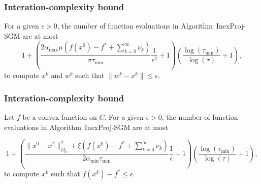 \begin{frame}[c]\frametitle{Interation-complexity bound}
\begin{theorem}
  For a given $\epsilon>0$, the number  of  function evaluations in  Algorithm~InexProj-SGM are  at most
    $$
      1+\left({\frac{2{\alpha_{\max}}\mu\left(f(x^0)-f^* +\sum_{k= 0}^{\infty}\nu_k\right) }{\sigma \tau_{\min}}} \frac{1}{\epsilon^2}+1\right) \left(\frac{\log (\tau_{\min})}{\log (\tau)}+1\right),
    $$
  to compute $x^k$ and $w^k$ such that $\|  w^{k}-x^{k}\|\leq \epsilon$.
\end{theorem}
\end{frame}


\begin{frame}[c]\frametitle{Interation-complexity bound}
\begin{theorem}
  Let $f$ be a convex function on $C$. For a given $\epsilon>0$, the number  of  function evaluations in  Algorithm~InexProj-SGM are  at most

  $$
    1+\left(\frac{\|x^0 - x^*\|^2_{D_0} + \xi\left(f(x^0)-f^*+ \sum_{k=0}^{\infty} \nu_k\right)}{2 \alpha_{\min} \tau_{\min}}\frac{1}{\epsilon}+1\right) \left(\frac{\log (\tau_{\min})}{\log (\tau)}+1\right),
  $$
  to compute $x^k$ such that $f(x^k) - f^*\leq \epsilon$.
\end{theorem}
\end{frame}